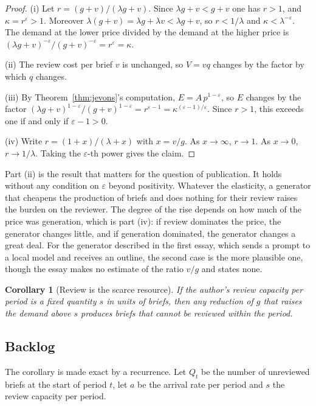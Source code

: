 \documentclass[11pt]{article}
\theoremstyle{plain}
\newtheorem{corollary}[theorem]{Corollary}
\theoremstyle{definition}
\theoremstyle{remark}
\begin{document}
\begin{proof}
(i) Let $r=(g+v)/(\lambda g+v)$. Since $\lambda g+v<g+v$ one has $r>1$, and $\kappa=r^{\varepsilon}>1$. Moreover $\lambda(g+v)=\lambda g+\lambda v<\lambda g+v$, so $r<1/\lambda$ and $\kappa<\lambda^{-\varepsilon}$. The demand at the lower price divided by the demand at the higher price is $(\lambda g+v)^{-\varepsilon}/(g+v)^{-\varepsilon}=r^{\varepsilon}=\kappa$.

(ii) The review cost per brief $v$ is unchanged, so $V=vq$ changes by the factor by which $q$ changes.

(iii) By Theorem~\ref{thm:jevons}'s computation, $E=A\,p^{1-\varepsilon}$, so $E$ changes by the factor $(\lambda g+v)^{1-\varepsilon}/(g+v)^{1-\varepsilon}=r^{\varepsilon-1}=\kappa^{(\varepsilon-1)/\varepsilon}$. Since $r>1$, this exceeds one if and only if $\varepsilon-1>0$.

(iv) Write $r=(1+x)/(\lambda+x)$ with $x=v/g$. As $x\to\infty$, $r\to1$. As $x\to0$, $r\to1/\lambda$. Taking the $\varepsilon$-th power gives the claim. \qedhere
\end{proof}

Part (ii) is the result that matters for the question of publication. It holds without any condition on $\varepsilon$ beyond positivity. Whatever the elasticity, a generator that cheapens the production of briefs and does nothing for their review raises the burden on the reviewer. The degree of the rise depends on how much of the price was generation, which is part (iv): if review dominates the price, the generator changes little, and if generation dominated, the generator changes a great deal. For the generator described in the first essay, which sends a prompt to a local model and receives an outline, the second case is the more plausible one, though the essay makes no estimate of the ratio $v/g$ and states none.

\begin{corollary}[Review is the scarce resource]\label{cor:scarce}
If the author's review capacity per period is a fixed quantity $s$ in units of briefs, then any reduction of $g$ that raises the demand above $s$ produces briefs that cannot be reviewed within the period.
\end{corollary}

\subsection{Backlog}

The corollary is made exact by a recurrence. Let $Q_t$ be the number of unreviewed briefs at the start of period $t$, let $a$ be the arrival rate per period and $s$ the review capacity per period.
\end{document}
